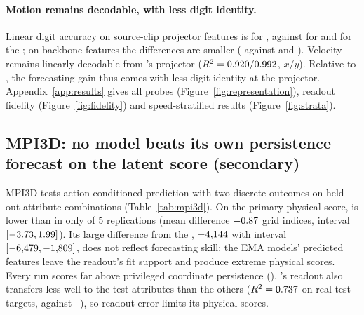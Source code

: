 \paragraph{Motion remains decodable, with less digit identity.} Linear digit accuracy on source-clip projector features is \VMMSOneProjDigit{} for \shvar{}, against \VMMSZeroProjDigit{} for \shdet{} and \VMMROneProjDigit{} for the \emavar{}; on backbone features the differences are smaller (\VMMSOneBackDigit{} against \VMMSZeroBackDigit{} and \VMMROneBackDigit). Velocity remains linearly decodable from \shvar{}'s projector ($R^2=0.920/0.992$, $x/y$). Relative to \shdet{}, the forecasting gain thus comes with less digit identity at the projector. Appendix~\ref{app:results} gives all probes (Figure~\ref{fig:representation}), readout fidelity (Figure~\ref{fig:fidelity}) and speed-stratified results (Figure~\ref{fig:strata}).

\subsection{MPI3D: no model beats its own persistence forecast on the latent score (secondary)}
\label{sec:mpi3d}

\begin{table}[t]
\caption{MPI3D forecasts over five replications per model ($\downarrow$ lower is better): physical score as mean $\pm$ sample SD, latent score as mean (min--max). Physical scores are in Euclidean grid indices; ``own persistence'' decodes the model's target-space embedding of the source. The latent score is computed in each model's own target space, so it compares each model only with its own persistence (0.5 by construction) and with the true two-outcome distribution (0.25); it does not rank the models. All queries use held-out attribute combinations. Appendix Table~\ref{tab:mpcontrols} gives all controls.}
\label{tab:mpi3d}
\centering
\small
\setlength{\tabcolsep}{3pt}

\end{table}

MPI3D tests action-conditioned prediction with two discrete outcomes on held-out attribute combinations (Table~\ref{tab:mpi3d}). On the primary physical score, \shvar{} is lower than \shdet{} in only \VMPSOneSZeroWins{} of 5 replications (mean difference $-0.87$ grid indices, interval $[-3.73,1.99]$). Its large difference from the \emavar{}, $-4{,}144$ with interval $[-6{,}479,-1{,}809]$, does not reflect forecasting skill: the EMA models' predicted features leave the readout's fit support and produce extreme physical scores. Every run scores far above privileged coordinate persistence (\VMPRefCoordPersist). \shvar{}'s readout also transfers less well to the test attributes than the others ($R^2=0.737$ on real test targets, against \VMPSZeroReadoutTestRtwo--\VMPRZeroReadoutTestRtwo), so readout error limits its physical scores.


